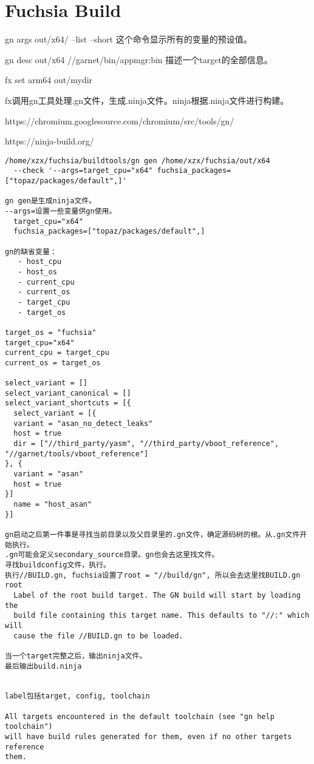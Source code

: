 \section{Fuchsia Build}
gn args out/x64/ --list --short
这个命令显示所有的变量的预设值。

gn desc out/x64 //garnet/bin/appmgr:bin
描述一个target的全部信息。


fx set arm64 out/mydir

fx调用gn工具处理.gn文件，生成.ninja文件。ninja根据.ninja文件进行构建。

https://chromium.googlesource.com/chromium/src/tools/gn/

https://ninja-build.org/

\begin{verbatim}
/home/xzx/fuchsia/buildtools/gn gen /home/xzx/fuchsia/out/x64 
  --check '--args=target_cpu="x64" fuchsia_packages=["topaz/packages/default",]'

gn gen是生成ninja文件。
--args=设置一些变量供gn使用。
  target_cpu="x64" 
  fuchsia_packages=["topaz/packages/default",]

gn的缺省变量：
   - host_cpu
   - host_os
   - current_cpu
   - current_os
   - target_cpu
   - target_os

target_os = "fuchsia"
target_cpu="x64"
current_cpu = target_cpu
current_os = target_os

select_variant = []
select_variant_canonical = []
select_variant_shortcuts = [{
  select_variant = [{
  variant = "asan_no_detect_leaks"
  host = true
  dir = ["//third_party/yasm", "//third_party/vboot_reference", "//garnet/tools/vboot_reference"]
}, {
  variant = "asan"
  host = true
}]
  name = "host_asan"
}]

gn启动之后第一件事是寻找当前目录以及父目录里的.gn文件，确定源码树的根。从.gn文件开始执行。
.gn可能会定义secondary_source目录。gn也会去这里找文件。
寻找buildconfig文件，执行。
执行//BUILD.gn, fuchsia设置了root = "//build/gn", 所以会去这里找BUILD.gn
root  
  Label of the root build target. The GN build will start by loading the
  build file containing this target name. This defaults to "//:" which will
  cause the file //BUILD.gn to be loaded.

当一个target完整之后，输出ninja文件。
最后输出build.ninja


label包括target, config, toolchain

All targets encountered in the default toolchain (see "gn help toolchain")
will have build rules generated for them, even if no other targets reference
them.


\end{verbatim}
